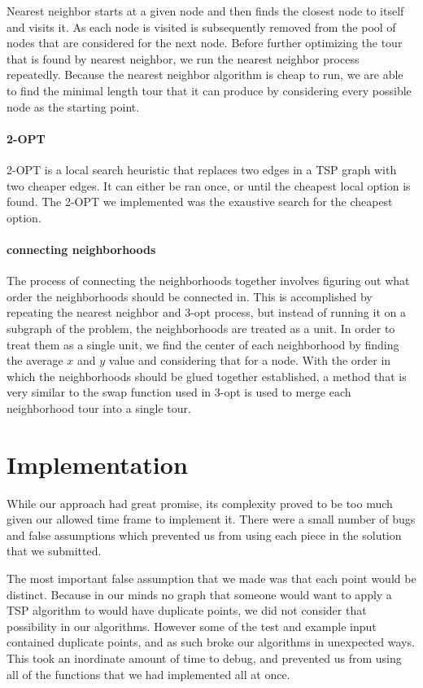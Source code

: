 \documentclass[12pt]{article}
\begin{document}
Nearest neighbor starts at a given node and then finds the closest node to
itself and visits it. As each node is visited is subsequently removed from the
pool of nodes that are considered for the next node. Before further optimizing
the tour that is found by nearest neighbor, we run the nearest neighbor process
repeatedly. Because the nearest neighbor algorithm is cheap to run, we are able
to find the minimal length tour that it can produce by considering every
possible node as the starting point. 

\paragraph{2-OPT}

2-OPT is a local search heuristic that replaces two edges in a TSP graph
with two cheaper edges. It can either be ran once, or until the cheapest
local option is found. The 2-OPT we implemented was the exaustive search
for the cheapest option.

\paragraph{connecting neighborhoods}

The process of connecting the neighborhoods together involves figuring out what
order the neighborhoods should be connected in. This is accomplished by
repeating the nearest neighbor and 3-opt process, but instead of running it on
a subgraph of the problem, the neighborhoods are treated as a unit.  In order
to treat them as a single unit, we find the center of each neighborhood by
finding the average $x$ and $y$ value and considering that for a node.  With
the order in which the neighborhoods should be glued together established, a
method that is very similar to the swap function used in 3-opt is used to merge
each neighborhood tour into a single tour.


\section*{Implementation}

While our approach had great promise, its complexity proved to be too much
given our allowed time frame to implement it.  There were a small number of
bugs and false assumptions which prevented us from using each piece in the
solution that we submitted.

The most important false assumption that we made was that each point would be
distinct.  Because in our minds no graph that someone would want to apply a TSP
algorithm to would have duplicate points, we did not consider that possibility
in our algorithms.  However some of the test and example input contained
duplicate points, and as such broke our algorithms in unexpected ways.  This
took an inordinate amount of time to debug, and prevented us from using all of
the functions that we had implemented all at once.
\end{document}
